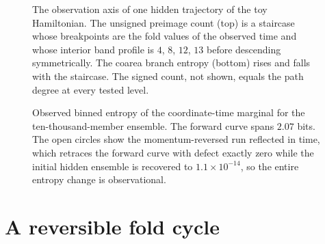\documentclass[aps,pre,reprint,nofootinbib]{revtex4-2}
\begin{document}
\begin{figure}[t]
\centering
{}
\caption{The observation axis of one hidden trajectory of the toy
Hamiltonian.  The unsigned preimage count (top) is a staircase whose
breakpoints are the fold values of the observed time and whose interior
band profile is $4$, $8$, $12$, $13$ before descending symmetrically.  The
coarea branch entropy (bottom) rises and falls with the staircase.  The
signed count, not shown, equals the path degree at every tested level.}
\label{fig:staircase}
\end{figure}

\begin{figure}[t]
\centering
{}
\caption{Observed binned entropy of the coordinate-time marginal for the
ten-thousand-member ensemble.  The forward curve spans $2.07$ bits.  The
open circles show the momentum-reversed run reflected in time, which
retraces the forward curve with defect exactly zero while the initial
hidden ensemble is recovered to $1.1\times 10^{-14}$, so the entire
entropy change is observational.}
\label{fig:cycle}
\end{figure}

\section{A reversible fold cycle}
\label{sec:cycle}
\end{document}
